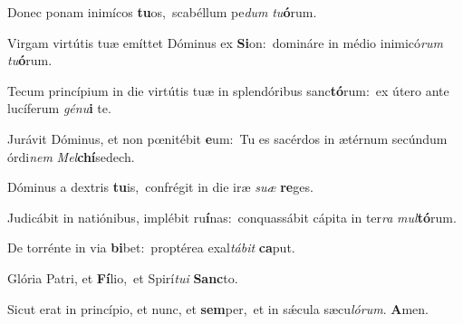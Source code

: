 \setcounter{versecount}{2}

\vs Donec ponam inimícos \textbf{tu}os,~\redgreheightstar scabéllum pe\textit{dum} \textit{tu}\textbf{ó}rum.

\vs Virgam virtútis tuæ emíttet Dóminus ex \textbf{Si}on:~\redgreheightstar domináre in médio inimicó\textit{rum} \textit{tu}\textbf{ó}rum.

\vs Tecum princípium in die virtútis tuæ in splendóribus sanc\textbf{tó}rum:~\redgreheightstar ex útero ante lucíferum \textit{gé}\textit{nu}\textbf{i} te.

\vs Jurávit Dóminus, et non pœnitébit \textbf{e}um:~\redgreheightstar Tu es sacérdos in ætérnum secúndum órdi\textit{nem} \textit{Mel}\textbf{chí}sedech.

\vs Dóminus a dextris \textbf{tu}is,~\redgreheightstar confrégit in die iræ \textit{su}\textit{æ} \textbf{re}ges.

\vs Judicábit in natiónibus, implébit ru\textbf{í}nas:~\redgreheightstar conquassábit cápita in ter\textit{ra} \textit{mul}\textbf{tó}rum.

\vs De torrénte in via \textbf{bi}bet:~\redgreheightstar proptérea exal\textit{tá}\textit{bit} \textbf{ca}put.

\vs Glória Patri, et \textbf{Fí}lio,~\redgreheightstar et Spirí\textit{tu}\textit{i} \textbf{Sanc}to.

\vs Sicut erat in princípio, et nunc, et \textbf{sem}per,~\redgreheightstar et in sǽcula sæcu\textit{ló}\textit{rum}. \textbf{A}men.

